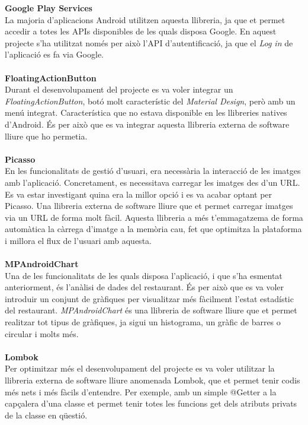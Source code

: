 \textbf{\large Google Play Services}\cite{googleplayservices}\\
La majoria d'aplicacions Android utilitzen aquesta llibreria, ja que et permet accedir a totes les APIs disponibles de les quals disposa Google. En aquest projecte s'ha utilitzat només per això l'API d'autentificació, ja que el \textit{Log in} de l'aplicació es fa via Google.
\\\\
\textbf{\large FloatingActionButton}\cite{floatingactionbutton}\\
Durant el desenvolupament del projecte es va voler integrar un \textit{FloatingActionButton}, botó molt característic del \textit{Material Design}, però amb un menú integrat. Característica que no estava disponible en les llibreries natives d'Android. És per això que es va integrar aquesta llibreria externa de software lliure que ho permetia.
\\\\
\textbf{\large Picasso}\cite{picasso}\\
En les funcionalitats de gestió d'usuari, era necessària la interacció de les imatges amb l'aplicació. Concretament, es necessitava carregar les imatges des d'un URL. Es va estar investigant quina era la millor opció i es va acabar optant per Picasso. Una llibreria externa de software lliure que et permet carregar imatges via un URL de forma molt fàcil. Aquesta llibreria a més t'emmagatzema de forma automàtica la càrrega d'imatge a la memòria cau, fet que optimitza la plataforma i millora el flux de l'usuari amb aquesta.
\\\\
\textbf{\large MPAndroidChart}\cite{mpandroidchart}\\
Una de les funcionalitats de les quals disposa l'aplicació, i que s'ha esmentat anteriorment, és l'anàlisi de dades del restaurant. És per això que es va voler introduir un conjunt de gràfiques per visualitzar més fàcilment l'estat estadístic del restaurant. \textit{MPAndroidChart} és una llibreria de software lliure que et permet realitzar tot tipus de gràfiques, ja sigui un histograma, un gràfic de barres o circular i molts més.
\\\\
\textbf{\large Lombok}\cite{lombok}\\
Per optimitzar més el desenvolupament del projecte es va voler utilitzar la llibreria externa de software lliure anomenada Lombok, que et permet tenir codis més nets i més fàcils d'entendre. Per exemple, amb un simple @Getter a la capçalera d'una classe et permet tenir totes les funcions get dels atributs privats de la classe en qüestió.
